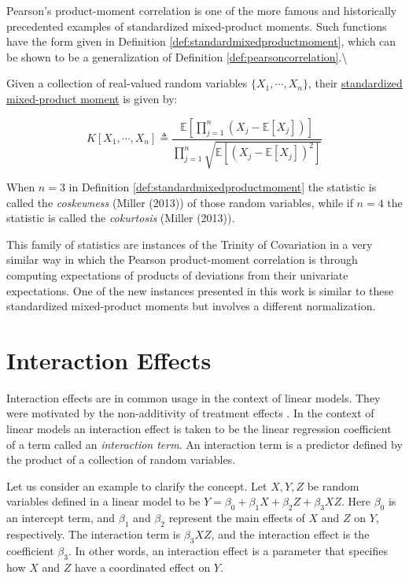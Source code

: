 \documentclass[
  letterpaper,
  DIV=11,
  numbers=noendperiod]{scrreprt}
\begin{document}
Pearson's product-moment correlation is one of the more famous and
historically precedented examples of standardized mixed-product moments.
Such functions have the form given in Definition
\ref{def:standardmixedproductmoment}, which can be shown to be a
generalization of Definition
\ref{def:pearsoncorrelation}.\textbackslash{}

\begin{Definition}[mydefinition=Standardized Mixed-Product Moment, label=def:standardmixedproductmoment]
Given a collection of real-valued random variables $\{X_1, \cdots, X_n \}$, their \underline{standardized mixed-product moment} is given by:

$$K \left[X_1, \cdots, X_n \right] \triangleq \frac{\mathbb{E} \left[ \prod_{j=1}^{n} \left( X_j - \mathbb{E} \left[ X_j \right] \right) \right]}{\prod_{j=1}^{n} \sqrt{\mathbb{E} \left[ \left (X_j - \mathbb{E} \left[ X_j \right] \right)^2 \right]}}$$
\end{Definition}

When \(n=3\) in Definition \ref{def:standardmixedproductmoment} the
statistic is called the \textit{coskewness} (Miller (2013)) of those
random variables, while if \(n=4\) the statistic is called the
\textit{cokurtosis} (Miller (2013)).

This family of statistics are instances of the Trinity of Covariation in
a very similar way in which the Pearson product-moment correlation is
through computing expectations of products of deviations from their
univariate expectations. One of the new instances presented in this work
is similar to these standardized mixed-product moments but involves a
different normalization.

\section{Interaction Effects}\label{interaction-effects}

Interaction effects are in common usage in the context of linear models.
They were motivated by the non-additivity of treatment effects
\cite{Cox1984}. In the context of linear models an interaction effect is
taken to be the linear regression coefficient of a term called an
\textit{interaction term}. An interaction term is a predictor defined by
the product of a collection of random variables.

Let us consider an example to clarify the concept. Let \(X,Y,Z\) be
random variables defined in a linear model to be
\(Y = \beta_0 + \beta_1 X + \beta_2 Z + \beta_3 X Z\). Here \(\beta_0\)
is an intercept term, and \(\beta_1\) and \(\beta_2\) represent the main
effects of \(X\) and \(Z\) on \(Y\), respectively. The interaction term
is \(\beta_3 XZ\), and the interaction effect is the coefficient
\(\beta_3\). In other words, an interaction effect is a parameter that
specifies how \(X\) and \(Z\) have a coordinated effect on \(Y\).
\end{document}
